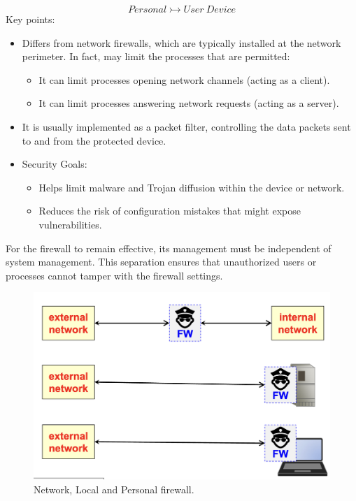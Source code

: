 \[
Personal \rightarrowtail User\ Device
\]
Key points:
\begin{itemize}
    \item Differs from network firewalls, which are typically installed at the network perimeter. In fact, may limit the processes that are permitted:
    \begin{itemize}
        \item It can limit processes opening network channels (acting as a client).
        \item It can limit processes answering network requests (acting as a server).
    \end{itemize}
    \item It is usually implemented as a packet filter, controlling the data packets sent to and from the protected device.
    \item Security Goals:
    \begin{itemize}
        \item Helps limit malware and Trojan diffusion within the device or network.
        \item Reduces the risk of configuration mistakes that might expose vulnerabilities.
    \end{itemize}
\end{itemize}

\begin{tcolorbox}[colback=red!10!white, colframe=red!70!black, coltitle=white, title=Beware]
    For the firewall to remain effective, its management must be independent of system management. This separation ensures that unauthorized users or processes cannot tamper with the firewall settings.
\end{tcolorbox}

\begin{figure}[H]
    \centering
    \includegraphics[width=0.7\linewidth]{Images/Firewalling/local_personal_firewall.png}
    \caption{Network, Local and Personal firewall.}
\end{figure}

